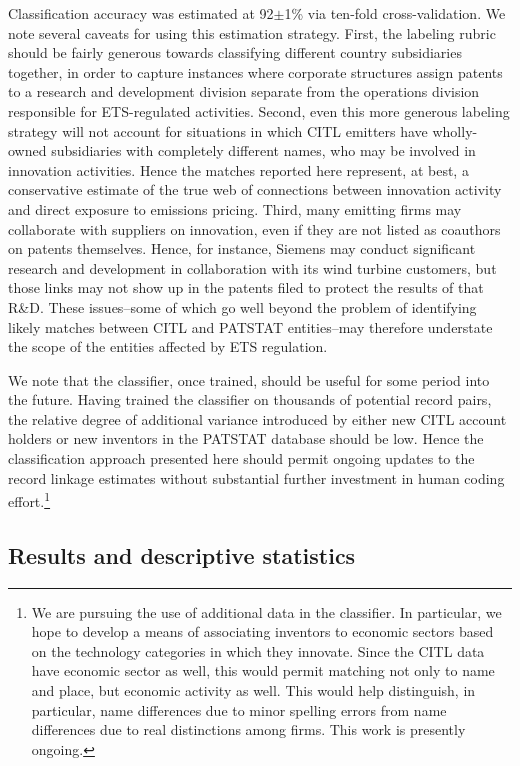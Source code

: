 \documentclass[11pt]{article}
\begin{document}
Classification accuracy was estimated at 92$\pm$1\% via ten-fold
cross-validation. We note several caveats for using this estimation
strategy. First, the labeling rubric should be fairly generous towards
classifying different country subsidiaries together, in order to
capture instances where corporate structures assign patents to a research and
development division separate from the operations division responsible
for ETS-regulated activities. Second, even this more generous labeling
strategy will not account for situations in which CITL emitters have
wholly-owned subsidiaries with completely different names, who may be
involved in innovation activities. Hence the matches reported here
represent, at best, a conservative estimate of the true web of
connections between innovation activity and direct exposure to
emissions pricing. Third, many emitting firms may collaborate with
suppliers on innovation, even if they are not listed as coauthors on
patents themselves. Hence, for instance, Siemens may conduct
significant research and development in collaboration with its wind
turbine customers, but those links may not show up in the patents
filed to protect the results of that R\&D. These issues--some of which
go well beyond the problem of identifying likely matches between CITL
and PATSTAT entities--may therefore understate the scope of the
entities affected by ETS regulation.

We note that the classifier, once trained, should be useful for some
period into the future. Having trained the classifier on thousands of
potential record pairs, the relative degree of additional variance
introduced by either new CITL account holders or new inventors in the
PATSTAT database should be low. Hence the classification approach
presented here should permit ongoing updates to the record linkage
estimates without substantial further investment in human coding
effort.\footnote{We are pursuing the use of additional data in the
  classifier. In particular, we hope to develop a means of associating
inventors to economic sectors based on the technology categories in
which they innovate. Since the CITL data have economic sector as well,
this would permit matching not only to name and place, but economic
activity as well. This would help distinguish, in particular, name
differences due to minor spelling errors from name differences due to
real distinctions among firms. This work is presently ongoing.}

\subsection{Results and descriptive statistics}
\label{sec:descr-stat}
\end{document}
